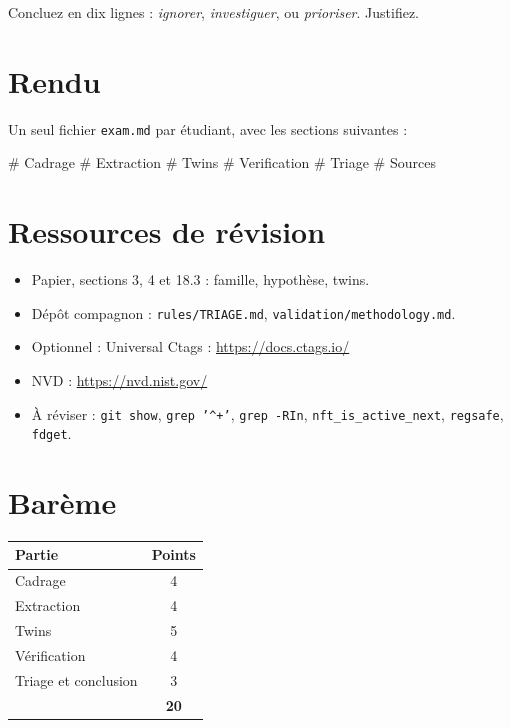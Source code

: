 \documentclass{training-exam}
\begin{document}
Concluez en dix lignes : \emph{ignorer}, \emph{investiguer}, ou
\emph{prioriser}. Justifiez.


\chapter{Rendu}

Un seul fichier \texttt{exam.md} par étudiant, avec les sections suivantes :

\begin{console}
# Cadrage
# Extraction
# Twins
# Verification
# Triage
# Sources
\end{console}

\chapter{Ressources de révision}

\begin{itemize}
  \item Papier, sections 3, 4 et 18.3 : famille, hypothèse, twins.
  \item Dépôt compagnon : \texttt{rules/TRIAGE.md},
        \texttt{validation/methodology.md}.
  \item Optionnel : Universal Ctags : \url{https://docs.ctags.io/}
  \item NVD : \url{https://nvd.nist.gov/}
  \item À réviser : \texttt{git show}, \texttt{grep '\string^+'},
        \texttt{grep -RIn}, \texttt{nft\_is\_active\_next}, \texttt{regsafe},
        \texttt{fdget}.
\end{itemize}

\chapter{Barème}

\begin{center}
\begin{tabularx}{\linewidth}{|l|c|}
\hline
\textbf{Partie} & \textbf{Points} \\ \hline
Cadrage & 4 \\ \hline
Extraction & 4 \\ \hline
Twins & 5 \\ \hline
Vérification & 4 \\ \hline
Triage et conclusion & 3 \\ \hline
& \textbf{20} \\ \hline
\end{tabularx}
\end{center}

\end{document}
